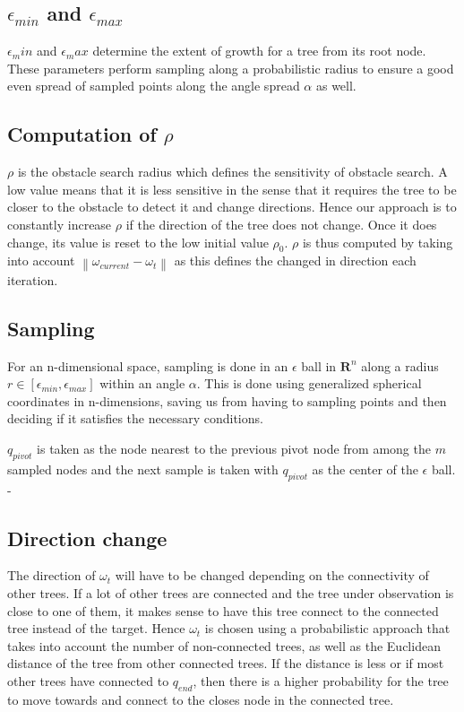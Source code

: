 \documentclass[fleqn]{article}
\newcommand{\norm}[1]{\left\lVert #1 \right\rVert}
\begin{document}
	\subsection*{$\epsilon_{min}$ and $\epsilon_{max}$ }    
	$\epsilon_min$ and $\epsilon_max$ determine the extent of growth for a tree from its root node. These parameters perform sampling along a probabilistic radius to ensure a good even spread of sampled points along the angle spread $\alpha$ as well.   
	
	\subsection*{Computation of $\rho$}
	$\rho$ is the obstacle search radius which defines the sensitivity of obstacle search. A low value means that it is less sensitive in the sense that it requires the tree to be closer to the obstacle to detect it and change directions. Hence our approach is to constantly increase $\rho$ if the direction of the tree does not change. Once it does change, its value is reset to the low initial value $\rho_0$. $\rho$ is thus computed by taking into account $\norm{\omega_{current} - \omega_t}$ as this defines the changed in direction each iteration.
	
	\subsection*{Sampling}
	
	For an n-dimensional space, sampling is done in an $\epsilon$ ball in $\mathbf{R}^n$ along a radius $r \in [\epsilon_{min}, \epsilon_{max}]$ within an angle $\alpha$. This is done using generalized spherical coordinates in n-dimensions, saving us from having to sampling points and then deciding if it satisfies the necessary conditions.
	
	$q_{pivot}$ is taken as the node nearest to the previous pivot node from among the $m$ sampled nodes and the next sample is taken with $q_{pivot}$ as the center of the $\epsilon$ ball.
	-
	\subsection*{Direction change}
	
	The direction of $\omega_t$ will have to be changed depending on the connectivity of other trees. If a lot of other trees are connected and the tree under observation is close to one of them, it makes sense to have this tree connect to the connected tree instead of the target. Hence $\omega_t$ is chosen using a probabilistic approach that takes into account the number of non-connected trees, as well as the Euclidean distance of the tree from other connected trees. If the distance is less or if most other trees have connected to $q_{end}$, then there is a higher probability for the tree to move towards and connect to the closes node in the connected tree.
	
\end{document}
